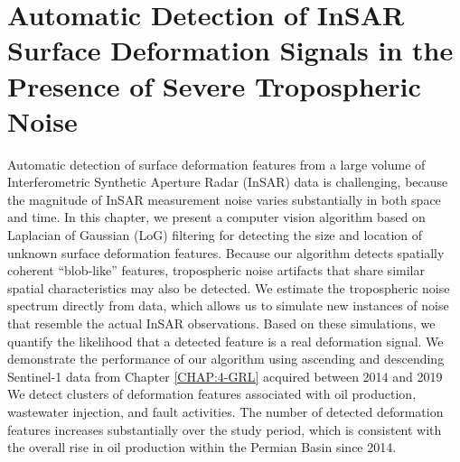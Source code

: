 
\chapter{Automatic Detection of InSAR Surface Deformation Signals in the Presence of Severe Tropospheric Noise}
\label{CHAP:6-blob}

Automatic detection of surface deformation features from a large volume of Interferometric Synthetic Aperture Radar (InSAR) data is challenging, because the magnitude of InSAR measurement noise varies substantially in both space and time. In this chapter, we present a computer vision algorithm based on Laplacian of Gaussian (LoG) filtering for detecting the size and location of unknown surface deformation features. Because our algorithm detects spatially coherent ``blob-like'' features, tropospheric noise artifacts that share similar spatial characteristics may also be detected. We estimate the tropospheric noise spectrum directly from data, which allows us to simulate new instances of noise that resemble the actual InSAR observations. Based on these simulations, we quantify the likelihood that a detected feature is a real deformation signal. We demonstrate the performance of our algorithm using 
ascending and descending Sentinel-1 data from Chapter \ref{CHAP:4-GRL} acquired between 2014 and 2019
We detect clusters of deformation features associated with oil production, wastewater injection, and fault activities. The number of detected deformation features increases substantially over the study period, which is consistent with the overall rise in oil production within the Permian Basin since 2014. 




